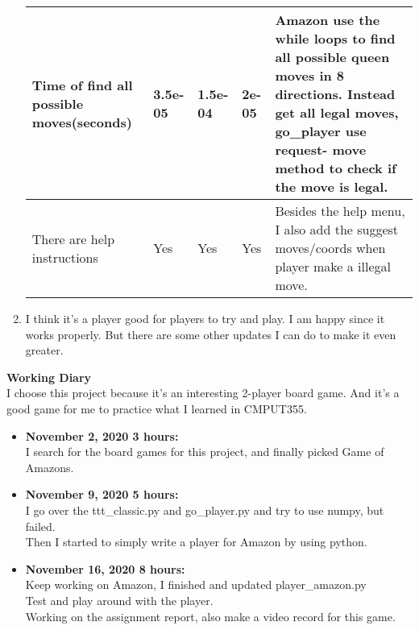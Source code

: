 \documentclass{article}
\begin{document}
\begin{enumerate}
\begin{center}
\begin{tabular}{| p{4.5cm} | p{2cm} | p{2cm} | p{2cm} | p{5cm} |}
    Time of find all possible moves\newline (seconds) &3.5e-05 & 1.5e-04 & 2e-05 & Amazon use the while loops to find all possible queen moves in 8 directions. Instead get all legal moves, go\_player use request- move method to check if the move is legal. \\ \hline
    There are help instructions & Yes & Yes& Yes & Besides the help menu, I also add the suggest moves/coords when player make a illegal move. \\ \hline 
    \end{tabular}
\end{center}
   \item I think it's a player good for players to try and play. I am happy since it works properly. But there are some other updates I can do to make it even greater.\\
\end{enumerate}
\textbf{Working Diary }\\
I choose this project because it's an interesting 2-player board game. And it's a good game for me to practice what I learned in CMPUT355.\\
\begin{itemize}
\item \textbf{November 2, 2020  3 hours: } \\
I search for the board games for this project, and finally picked Game of Amazons.\\
\item \textbf{November 9, 2020  5 hours: }\\
I go over the ttt\_classic.py and go\_player.py and try to use numpy, but failed.\\
Then I started to simply write a player for Amazon by using python.\\
\item \textbf{November 16, 2020 8 hours: }\\
Keep working on Amazon, I finished and updated player\_amazon.py\\
Test and play around with the player.\\
Working on the assignment report, also make a video record for this game.
\end{itemize}
\end{document}
